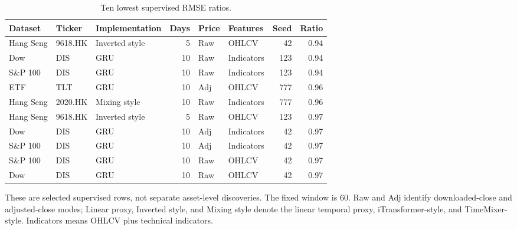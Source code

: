 \begin{table}[htbp]
\centering
\caption{Ten lowest supervised RMSE ratios.}
\label{tab:best_rows}
\small
\setlength{\tabcolsep}{4pt}
\begin{tabular}{lllrllrr}
\toprule
Dataset & Ticker & Implementation & Days & Price & Features & Seed & Ratio \\
\midrule
Hang Seng & 9618.HK & Inverted style & 5 & Raw & OHLCV & 42 & 0.94 \\
Dow & DIS & GRU & 10 & Raw & Indicators & 123 & 0.94 \\
S\&P 100 & DIS & GRU & 10 & Raw & Indicators & 123 & 0.94 \\
ETF & TLT & GRU & 10 & Adj & OHLCV & 777 & 0.96 \\
Hang Seng & 2020.HK & Mixing style & 10 & Raw & Indicators & 777 & 0.96 \\
Hang Seng & 9618.HK & Inverted style & 5 & Raw & OHLCV & 123 & 0.97 \\
Dow & DIS & GRU & 10 & Adj & Indicators & 42 & 0.97 \\
S\&P 100 & DIS & GRU & 10 & Adj & Indicators & 42 & 0.97 \\
S\&P 100 & DIS & GRU & 10 & Raw & OHLCV & 42 & 0.97 \\
Dow & DIS & GRU & 10 & Raw & OHLCV & 42 & 0.97 \\
\bottomrule
\end{tabular}
\par\smallskip\parbox{0.97\linewidth}{\footnotesize These are selected supervised rows, not separate asset-level discoveries. The fixed window is 60. Raw and Adj identify downloaded-close and adjusted-close modes; Linear proxy, Inverted style, and Mixing style denote the linear temporal proxy, iTransformer-style, and TimeMixer-style. Indicators means OHLCV plus technical indicators.}
\end{table}

